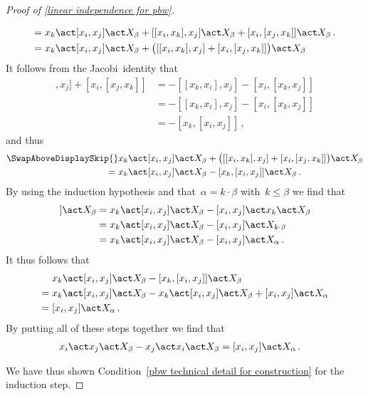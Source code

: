 \begin{proof}[Proof of \cref{linear independence for pbw}]
\begin{description}
\begin{align*}
				={}&
				x_k \act [x_i, x_j] \act X_\beta
				+ [[x_i, x_k], x_j] \act X_\beta
				+ [x_i, [x_j, x_k]] \act X_\beta \,.
				\\
				={}&
				x_k \act [x_i, x_j] \act X_\beta
				+ \bigl( [[x_i, x_k], x_j] + [x_i, [x_j, x_k]] \bigr) \act X_\beta
			\end{align*}
			It follows from the Jacobi~identity that
			\begin{align*}
				[[x_i, x_k], x_j] + [x_i, [x_j, x_k]]
				&=
				- [[x_k, x_i], x_j] - [x_i, [x_k, x_j]]
				\\
				&=
				- [[x_k, x_i], x_j] - [x_i, [x_k, x_j]]
				\\
				&=
				- [x_k, [x_i, x_j]] \,,
			\end{align*}
			and thus
			\begin{align*}
				\SwapAboveDisplaySkip
				{}&
				x_k \act [x_i, x_j] \act X_\beta
				+ \bigl( [[x_i, x_k], x_j] + [x_i, [x_j, x_k]] \bigr) \act X_\beta
				\\
				={}&
				x_k \act [x_i, x_j] \act X_\beta
				- [x_k, [x_i, x_j] ] \act X_\beta \,.
			\end{align*}
			By using the induction hypothesis and that~$\alpha = k \cdot \beta$ with~$k \leq \beta$ we find that
			\begin{align*}
				[x_k, [x_i, x_j]] \act X_\beta
				&=
				x_k \act [x_i, x_j] \act X_\beta
				- [x_i, x_j] \act x_k \act X_\beta
				\\
				&=
				x_k \act [x_i, x_j] \act X_\beta
				- [x_i, x_j] \act X_{k \cdot \beta}
				\\
				&=
				x_k \act [x_i, x_j] \act X_\beta
				- [x_i, x_j] \act X_{\alpha} \,.
			\end{align*}
			It thus follows that
			\begin{align*}
				{}&
				x_k \act [x_i, x_j] \act X_\beta
				- [x_k, [x_i, x_j] ] \act X_\beta
				\\
				={}&
				x_k \act [x_i, x_j] \act X_\beta
				- x_k \act [x_i, x_j] \act X_\beta
				+ [x_i, x_j] \act X_{\alpha}
				\\
				={}&
				[x_i, x_j] \act X_{\alpha} \,.
			\end{align*}
			By putting all of these steps together we find that
			\begin{align*}
				x_i \act x_j \act X_\beta
				- x_j \act x_i \act X_\beta
				&=
				[x_i, x_j] \act X_{\alpha} \,.
			\end{align*}
	\end{description}
	We have thus shown Condition~\ref{pbw technical detail for construction} for the induction step.


\end{proof}
